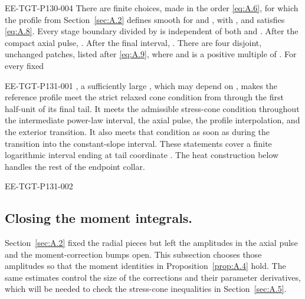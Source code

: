 \begin{proposition}\label{prop:A.4}
\begin{EESegment}{EE-TGT-P130-004}
There are finite choices, made in the order \eqref{eq:A.6}, for which the profile from
Section~\ref{sec:A.2} defines smooth  for
 and , with
, and satisfies \eqref{eq:A.8}. Every stage boundary divided
by  is independent of both
 and . After the compact axial
pulse, . After the final interval,
. There are four disjoint, unchanged patches,
listed after \eqref{eq:A.9}, where  and
 is a positive multiple of
. For every fixed
\end{EESegment}
%
\begin{EESegment}{EE-TGT-P131-001}
\NSi{NS-F-P131-001}{x_-\in(0,1]}, a sufficiently large
, which may depend on , makes the
reference profile meet the strict relaxed cone condition from
 through the first half-unit of its final tail. It meets the
admissible stress-cone condition throughout the
intermediate power-law interval, the axial pulse, the profile interpolation, and the exterior
transition. It also meets that condition as soon as  during the
transition into the constant-slope interval. These statements cover a finite logarithmic
interval ending at tail coordinate . The heat construction below
handles the rest of the endpoint collar.
\end{EESegment}
\end{proposition}

\begin{EESegment}{EE-TGT-P131-002}
\subsection{Closing the moment integrals.}\label{sec:A.3}
Section~\ref{sec:A.2} fixed the radial pieces but left the amplitudes in the axial pulse
and the moment-correction bumps open. This subsection chooses those amplitudes so that the
moment identities in Proposition~\ref{prop:A.4} hold. The same estimates control the size
of the corrections and their parameter derivatives, which will be needed to check the
stress-cone inequalities in Section~\ref{sec:A.5}.
\end{EESegment}

